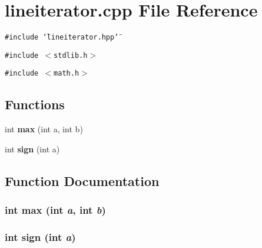 \section{lineiterator.cpp File Reference}
\label{lineiterator_8cpp}
{\tt \#include \char`\"{}lineiterator.hpp\char`\"{}}\par
{\tt \#include $<$stdlib.h$>$}\par
{\tt \#include $<$math.h$>$}\par
\subsection*{Functions}
\begin{CompactItemize}
\item 
int {\bf max} (int a, int b)
\item 
int {\bf sign} (int a)
\end{CompactItemize}


\subsection{Function Documentation}
\subsubsection{\setlength{\rightskip}{0pt plus 5cm}int max (int {\em a}, int {\em b})}\label{lineiterator_8cpp_a0}


\subsubsection{\setlength{\rightskip}{0pt plus 5cm}int sign (int {\em a})}\label{lineiterator_8cpp_a1}


